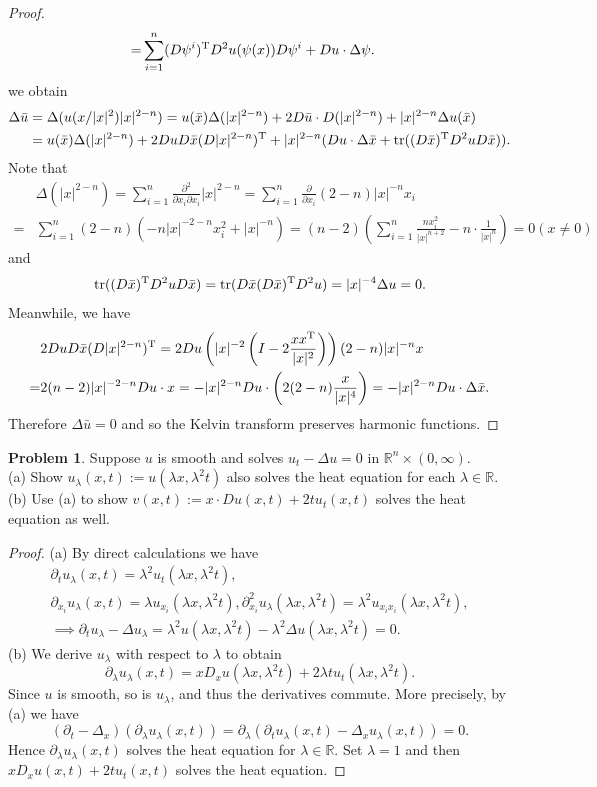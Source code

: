 \documentclass[hyperref,UTF8,12pt]{article}
\numberwithin{equation}{subsection}
\theoremstyle{plain}
\theoremstyle{definition}
\newtheorem{problem}{Problem}
\numberwithin{theorem}{section}
\numberwithin{lemma}{section}
\numberwithin{proposition}{section}
\numberwithin{remark}{section}
\numberwithin{corollary}{section}
\numberwithin{definition}{section}
\numberwithin{problem}{section}
\numberwithin{example}{section}
\def\T{\textup{T}}
\newcommand{\ptl}{\partial}
\newcommand{\mr}{\mathbb{R}}
\newcommand{\tr}{\operatorname{tr}}
\begin{document}
\begin{proof}
\[\begin{aligned}
	=&\sum_{i=1}^n(D\psi^i)^\T D^2u(\psi(x))D\psi^i+Du\cdot\Delta\psi.
\end{aligned}\] we obtain
\[\begin{aligned}
	\Delta\bar{u}&=\Delta(u(x/|x|^2)|x|^{2-n})=u(\bar{x})\Delta(|x|^{2-n})+2D\bar{u}\cdot D(|x|^{2-n})+|x|^{2-n}\Delta u(\bar{x})\\ &=u(\bar{x})\Delta(|x|^{2-n})+2DuD\bar{x}(D|x|^{2-n})^\T+|x|^{2-n}(Du\cdot\Delta\bar{x}+\tr((D\bar{x})^\T D^2uD\bar{x})).
\end{aligned}\]
Note that \[\begin{aligned}
	&\Delta(|x|^{2-n})=\sum_{i=1}^n\frac{\ptl^2}{\ptl x_i\ptl x_i}|x|^{2-n}
	=\sum_{i=1}^n\frac{\ptl}{\ptl x_i}(2-n)|x|^{-n}x_i\\
	=&\sum_{i=1}^n(2-n)(-n|x|^{-2-n}x_i^2+|x|^{-n})
	=(n-2)\left(\sum_{i=1}^n\frac{nx_i^2}{|x|^{n+2}}-n\cdot\frac{1}{|x|^n}\right)=0(x\neq0)\end{aligned}\] and\[\tr((D\bar{x})^\T D^2uD\bar{x})=\tr(D\bar{x}(D\bar{x})^\T D^2u)=|x|^{-4}\Delta u=0.\]
Meanwhile, we have \[\begin{aligned}
	&2DuD\bar{x}(D|x|^{2-n})^\T=2Du\left(|x|^{-2}\left(I-2\frac{xx^\T}{|x|^2}\right)\right)(2-n)|x|^{-n}x\\=&2(n-2)|x|^{-2-n}Du\cdot x=-|x|^{2-n}Du\cdot\left(2(2-n)\frac{x} {|x|^4}\right)=-|x|^{2-n}Du\cdot\Delta\bar{x}.
\end{aligned}\]Therefore $\Delta\bar{u}=0$ and so the Kelvin transform preserves harmonic functions.
\end{proof}
\begin{problem}
Suppose $u$ is smooth and solves $u_t-\Delta u=0$ in $\mr^n\times(0,\infty)$.\\[3pt]
(a) Show $u_\lambda(x,t):=u(\lambda x,\lambda^2t)$ also solves the heat equation for each $\lambda\in\mr$.\\[3pt]
(b) Use (a) to show $v(x,t):=x\cdot Du(x,t)+2tu_t(x,t)$ solves the heat equation as well.
\end{problem}
\begin{proof}
(a) By direct calculations we have\[\begin{gathered}
	\ptl_tu_\lambda(x,t)=\lambda^2u_t(\lambda x,\lambda^2t),\\
	\ptl_{x_i}u_\lambda(x,t)=\lambda u_{x_i}(\lambda x,\lambda^2t),\ptl_{x_i}^2 u_\lambda(\lambda x,\lambda^2t)=\lambda^2u_{x_ix_i}(\lambda x,\lambda^2t),\\
	\implies\ptl_tu_\lambda-\Delta u_\lambda=\lambda^2u(\lambda x,\lambda^2 t)-\lambda^2\Delta u(\lambda x,\lambda^2t)=0.
\end{gathered}\]
(b) We derive $u_\lambda$ with respect to $\lambda$ to obtain \[\ptl_\lambda u_\lambda (x,t)=xD_xu(\lambda x,\lambda^2t)+2\lambda tu_t(\lambda x,\lambda^2t).\]Since $u$ is smooth, so is $u_\lambda$, and thus the derivatives commute. More precisely, by (a) we have \[(\ptl_t-\Delta_x)(\ptl_\lambda u_\lambda(x,t))=\ptl_\lambda(\ptl_tu_\lambda(x,t)- \Delta_xu_\lambda(x,t))=0.\]Hence $\ptl_\lambda u_\lambda(x,t)$ solves the heat equation for $\lambda\in\mr$. Set $\lambda=1$ and then $xD_xu(x,t)+2tu_t(x,t)$ solves the heat equation.
\end{proof}
\end{document}
